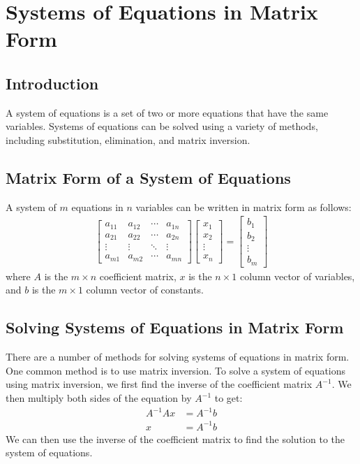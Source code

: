 \documentclass[12pt]{article}
\begin{document}
\section{Systems of Equations in Matrix Form}
\subsection{Introduction}
A system of equations is a set of two or more equations that have the same variables. Systems of equations can be solved using a variety of methods, including substitution, elimination, and matrix inversion.
\subsection{Matrix Form of a System of Equations}
A system of $m$ equations in $n$ variables can be written in matrix form as follows:
\begin{align}
\begin{bmatrix}
a_{11} & a_{12} & \cdots & a_{1n} \\
a_{21} & a_{22} & \cdots & a_{2n} \\
\vdots & \vdots & \ddots & \vdots \\
a_{m1} & a_{m2} & \cdots & a_{mn}
\end{bmatrix}
\begin{bmatrix}
x_1 \\
x_2 \\
\vdots \\
x_n
\end{bmatrix}
=
\begin{bmatrix}
b_1 \\
b_2 \\
\vdots \\
b_m
\end{bmatrix}
\end{align}
where $A$ is the $m \times n$ coefficient matrix, $x$ is the $n \times 1$ column vector of variables, and $b$ is the $m \times 1$ column vector of constants.
\subsection{Solving Systems of Equations in Matrix Form}
There are a number of methods for solving systems of equations in matrix form. One common method is to use matrix inversion. To solve a system of equations using matrix inversion, we first find the inverse of the coefficient matrix $A^{-1}$. We then multiply both sides of the equation by $A^{-1}$ to get:
\begin{align}
A^{-1}Ax &= A^{-1}b \\
x &= A^{-1}b
\end{align}
We can then use the inverse of the coefficient matrix to find the solution to the system of equations.
\end{document}
